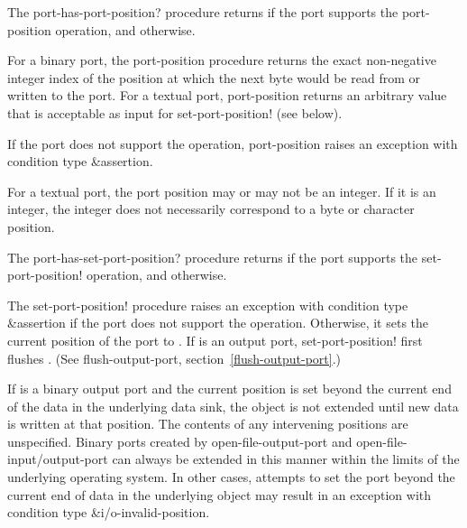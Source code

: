 \begin{entry}{%
}

The {\cf port-has-port-position?} procedure returns \schtrue{} if the
port supports the {\cf port-position} operation, and \schfalse{}
otherwise.

For a binary port, the {\cf port-position} procedure returns the exact
non-negative integer index of the position at which the next byte
would be read from or written to the port.  For a textual port, {\cf
  port-position} returns an arbitrary value that is acceptable as
input for {\cf set-port-position!} (see below).

If the port does not support the operation, {\cf port-position} raises
an exception with condition type {\cf\&assertion}.

\begin{note}
  For a textual port, the port position may or may not be an integer.
  If it is an integer, the integer does not necessarily correspond to
  a byte or character position.
\end{note}
\end{entry}   

\begin{entry}{%
}

   
The {\cf port-has-set-port-position?} procedure returns \schtrue{} if the port
supports the {\cf set-port-position!} operation, and \schfalse{}
otherwise.
   
The {\cf set-port-position!} procedure raises an
exception with condition type {\cf\&assertion}
if the port does not support the operation.
Otherwise, it sets the current position
of the port to .  If  is an output
port, {\cf set-port-position!} first flushes .  (See {\cf
  flush-output-port}, section~\ref{flush-output-port}.)

If  is a binary output port and the current position is set
beyond the current end of the data in the underlying data sink, the object is
not extended until new data is written at that position.
The contents of any intervening positions are unspecified.
Binary ports created by {\cf open-file-output-port} and
{\cf open-file-input/output-port} can always be extended in this manner
within the limits of the underlying operating system.
In other cases, attempts to set the port beyond the current end of data
in the underlying object may result in an exception with condition
type {\cf\&i/o-invalid-position}.
\end{entry}


